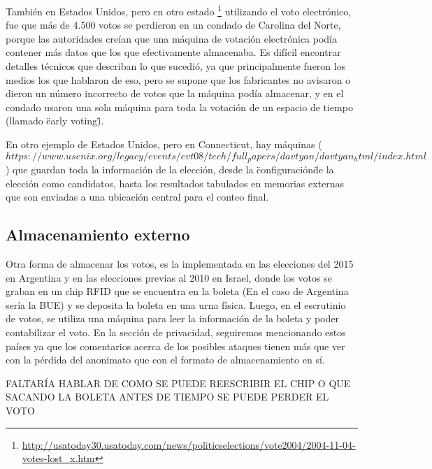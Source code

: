 También en Estados Unidos, pero en otro estado
\footnote{\url{http://usatoday30.usatoday.com/news/politicselections/vote2004/2004-11-04-votes-lost_x.htm}}
 utilizando el voto electrónico, fue que más de 4.500 votos se perdieron en un condado de Carolina del Norte, porque las autoridades creían que una máquina de votación electrónica podía contener más datos que los que efectivamente almacenaba. Es difícil encontrar detalles técnicos que describan lo que sucedió, ya que principalmente fueron los medios los que hablaron de eso, pero se supone que los fabricantes no avisaron o dieron un número incorrecto de votos que la máquina podía almacenar, y en el condado usaron una sola máquina para toda la votación de un espacio de tiempo (llamado \"early voting\").

En otro ejemplo de Estados Unidos, pero en Connecticut, hay máquinas ($https://www.usenix.org/legacy/events/evt08/tech/full_papers/davtyan/davtyan_html/index.html$) que guardan toda la información de la elección, desde la \"configuración\" de la elección como candidatos, hasta los resultados tabulados en memorias externas que son enviadas a una ubicación central para el conteo final.

\subsection{Almacenamiento externo}

Otra forma de almacenar los votos, es la implementada en las elecciones del 2015 en Argentina y en las elecciones previas al 2010 en Israel, donde los votos se graban en un chip RFID que se encuentra en la boleta (En el caso de Argentina sería la BUE) y se deposita la boleta en una urna física. Luego, en el escrutinio de votos, se utiliza una máquina para leer la información de la boleta y poder contabilizar el voto. En la sección de privacidad, seguiremos mencionando estos países ya que los comentarios acerca de los posibles ataques tienen más que ver con la pérdida del anonimato que con el formato de almacenamiento en sí.

FALTARÍA HABLAR DE COMO SE PUEDE REESCRIBIR EL CHIP O QUE SACANDO LA BOLETA ANTES DE TIEMPO SE PUEDE PERDER EL VOTO












